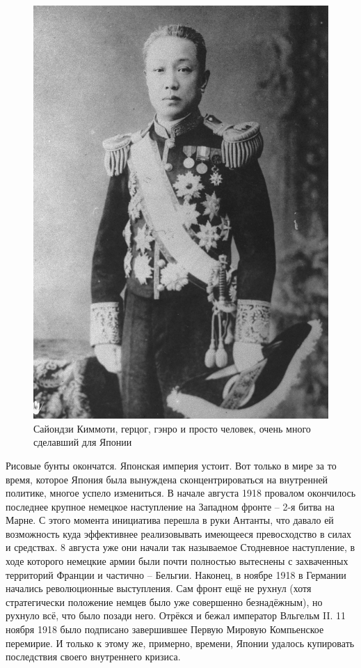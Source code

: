 \begin{figure}[h!tb] 
	\centering\includegraphics[scale=0.4]{Glava5/ESDTnoAPRIc.jpg}
	\caption{Сайондзи Киммоти, герцог, гэнро и просто человек, очень много сделавший для Японии}%
\end{figure}

Рисовые бунты окончатся. Японская империя устоит. Вот только в мире за то время, которое Япония была вынуждена сконцентрироваться на внутренней политике, многое успело измениться. В начале августа 1918 провалом окончилось последнее крупное немецкое наступление на Западном фронте – 2-я битва на Марне. С этого момента инициатива перешла в руки Антанты, что давало ей возможность куда эффективнее реализовывать имеющееся превосходство в силах и средствах. 8 августа уже они начали так называемое Стодневное наступление, в ходе которого немецкие армии были почти полностью вытеснены с захваченных территорий Франции и частично – Бельгии. Наконец, в ноябре 1918 в Германии начались революционные выступления. Сам фронт ещё не рухнул (хотя стратегически положение немцев было уже совершенно безнадёжным), но рухнуло всё, что было позади него. Отрёкся и бежал император Вльгельм II. 11 ноября 1918 было подписано завершившее Первую Мировую Компьенское перемирие. И только к этому же, примерно, времени, Японии удалось купировать последствия своего внутреннего кризиса.

